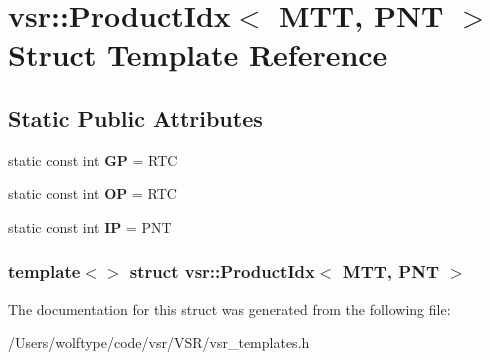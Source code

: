 \hypertarget{structvsr_1_1_product_idx_3_01_m_t_t_00_01_p_n_t_01_4}{\section{vsr\-:\-:Product\-Idx$<$ M\-T\-T, P\-N\-T $>$ Struct Template Reference}
\label{structvsr_1_1_product_idx_3_01_m_t_t_00_01_p_n_t_01_4}
}
\subsection*{Static Public Attributes}
\begin{DoxyCompactItemize}
\item 
\hypertarget{structvsr_1_1_product_idx_3_01_m_t_t_00_01_p_n_t_01_4_a2efde042f0ae1882fc66ce3602e6546e}{static const int {\bfseries G\-P} = R\-T\-C}\label{structvsr_1_1_product_idx_3_01_m_t_t_00_01_p_n_t_01_4_a2efde042f0ae1882fc66ce3602e6546e}

\item 
\hypertarget{structvsr_1_1_product_idx_3_01_m_t_t_00_01_p_n_t_01_4_ab2426dabff581a643f78e2e16578cfcd}{static const int {\bfseries O\-P} = R\-T\-C}\label{structvsr_1_1_product_idx_3_01_m_t_t_00_01_p_n_t_01_4_ab2426dabff581a643f78e2e16578cfcd}

\item 
\hypertarget{structvsr_1_1_product_idx_3_01_m_t_t_00_01_p_n_t_01_4_afcb0703e471e02f5389e48f1ebb11926}{static const int {\bfseries I\-P} = P\-N\-T}\label{structvsr_1_1_product_idx_3_01_m_t_t_00_01_p_n_t_01_4_afcb0703e471e02f5389e48f1ebb11926}

\end{DoxyCompactItemize}
\subsubsection*{template$<$$>$ struct vsr\-::\-Product\-Idx$<$ M\-T\-T, P\-N\-T $>$}



The documentation for this struct was generated from the following file\-:\begin{DoxyCompactItemize}
\item 
/\-Users/wolftype/code/vsr/\-V\-S\-R/vsr\-\_\-templates.\-h\end{DoxyCompactItemize}
